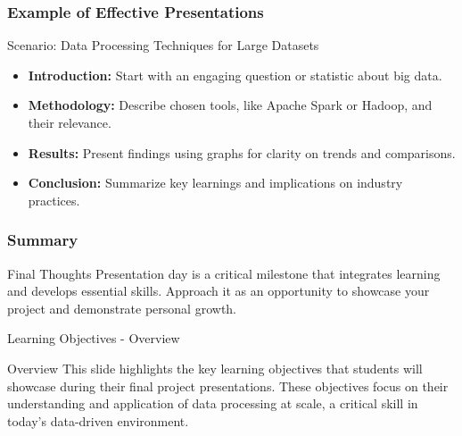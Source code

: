 \documentclass[aspectratio=169]{beamer}
\begin{document}
\begin{frame}[fragile]
    \frametitle{Example of Effective Presentations}
    \begin{block}{Scenario: Data Processing Techniques for Large Datasets}
        \begin{itemize}
            \item \textbf{Introduction:} Start with an engaging question or statistic about big data.
            \item \textbf{Methodology:} Describe chosen tools, like Apache Spark or Hadoop, and their relevance.
            \item \textbf{Results:} Present findings using graphs for clarity on trends and comparisons.
            \item \textbf{Conclusion:} Summarize key learnings and implications on industry practices.
        \end{itemize}
    \end{block}
\end{frame}

\begin{frame}[fragile]
    \frametitle{Summary}
    \begin{block}{Final Thoughts}
        Presentation day is a critical milestone that integrates learning and develops essential skills. Approach it as an opportunity to showcase your project and demonstrate personal growth.
    \end{block}
\end{frame}

\begin{frame}[fragile]{Learning Objectives - Overview}
    \begin{block}{Overview}
        This slide highlights the key learning objectives that students will showcase during their final project presentations. 
        These objectives focus on their understanding and application of data processing at scale, a critical skill in today’s data-driven environment.
    \end{block}
\end{frame}
\end{document}
